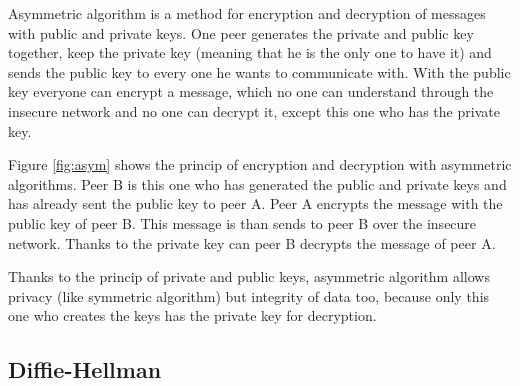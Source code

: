 Asymmetric algorithm is a method for encryption and decryption of messages with
public and private keys. \newline
One peer generates the private and public key together, keep the private key
(meaning that he is the only one to have it) and sends the public key to every
one he wants to communicate with.\newline
With the public key everyone can encrypt a message, which no one can understand
through the insecure network and no one can decrypt it, except this one who has
the private key.\newline

Figure \ref{fig:asym} shows the princip of encryption and decryption with
asymmetric algorithms.\newline
Peer B is this one who has generated the public and private keys and has already
sent the public key to peer A.\newline
Peer A encrypts the message with the public key of peer B. This
message is than sends to peer B over the insecure network.\newline
Thanks to the private key can peer B decrypts the message of peer A.\newline

Thanks to the princip of private and public keys, asymmetric algorithm allows
privacy (like symmetric algorithm) but integrity of data too, because only this
one who creates the keys has the private key for decryption.


\newpage

\subsection{Diffie-Hellman}

